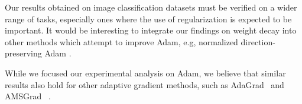 Our results obtained on image classification datasets must be verified on a wider range of tasks, especially ones where the use of regularization is expected to be important. It would be interesting to integrate our findings on weight decay into other methods which attempt to improve Adam, e.g, normalized direction-preserving Adam \citep{zhang2017normalized}. 

While we focused our experimental analysis on Adam, we believe that similar results also hold for other adaptive gradient methods, such as AdaGrad~\citep{duchi2011adaptive} and AMSGrad ~\citep{reddi2018iclr}.


